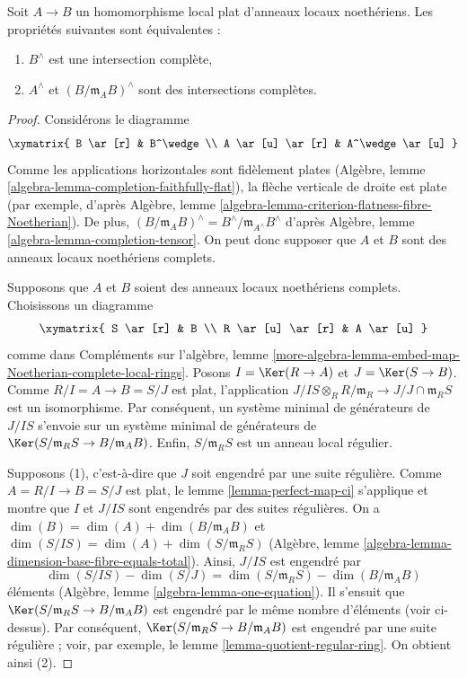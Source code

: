 \begin{proposition}
\label{proposition-avramov}
Soit $A \to B$ un homomorphisme local plat d'anneaux locaux noethériens. Les
propriétés suivantes sont équivalentes :
\begin{enumerate}
\item $B^\wedge$ est une intersection complète,
\item $A^\wedge$ et $(B/\mathfrak m_A B)^\wedge$ sont des intersections complètes.
\end{enumerate}
\end{proposition}

\begin{proof}
Considérons le diagramme
$$
\xymatrix{
B \ar[r] & B^\wedge\\
A \ar[u] \ar[r] & A^\wedge\ar[u]
}
$$
Comme les applications horizontales sont fidèlement
plates (Algèbre, lemme \ref{algebra-lemma-completion-faithfully-flat}),
la flèche verticale de droite est plate (par
exemple, d'après Algèbre, lemme
\ref{algebra-lemma-criterion-flatness-fibre-Noetherian}).
De plus,
$(B/\mathfrak m_A B)^\wedge = B^\wedge/\mathfrak m_{A^\wedge} B^\wedge$
d'après Algèbre, lemme \ref{algebra-lemma-completion-tensor}. On
peut donc supposer que $A$ et $B$ sont des anneaux locaux noethériens complets.

\medskip\noindent
Supposons que $A$ et $B$ soient des anneaux locaux noethériens complets.
Choisissons un diagramme
$$
\xymatrix{
S \ar[r] & B \\
R \ar[u] \ar[r] & A \ar[u]
}
$$
comme dans Compléments sur l'algèbre, lemme
\ref{more-algebra-lemma-embed-map-Noetherian-complete-local-rings}.
Posons $I = \Ker(R \to A)$ et $J = \Ker(S \to B)$.
Comme $R/I = A \to B = S/J$ est plat, l'application
$J/IS \otimes_R R/\mathfrak m_R \to J/J \cap\mathfrak m_R S$
est un isomorphisme. Par conséquent, un système minimal de générateurs de $J/IS$
s'envoie sur un système minimal de générateurs de
$\Ker(S/\mathfrak m_R S \to B/\mathfrak m_A B)$.
Enfin, $S/\mathfrak m_R S$ est un anneau local régulier.

\medskip\noindent
Supposons (1), c'est-à-dire que $J$ soit engendré par une suite régulière.
Comme $A = R/I \to B = S/J$ est plat, le
lemme \ref{lemma-perfect-map-ci} s'applique et montre
que $I$ et $J/IS$ sont engendrés par des suites
régulières. On a $\dim(B) = \dim(A) + \dim(B/\mathfrak m_A B)$ et
$\dim(S/IS) = \dim(A) + \dim(S/\mathfrak m_R S)$
(Algèbre, lemme \ref{algebra-lemma-dimension-base-fibre-equals-total}).
Ainsi, $J/IS$ est engendré par
$$
\dim(S/IS) - \dim(S/J) = \dim(S/\mathfrak m_R S) - \dim(B/\mathfrak m_A B)
$$
éléments (Algèbre, lemme \ref{algebra-lemma-one-equation}).
Il s'ensuit que $\Ker(S/\mathfrak m_R S \to B/\mathfrak m_A B)$
est engendré par le même nombre d'éléments (voir ci-dessus). Par
conséquent, $\Ker(S/\mathfrak m_R S \to B/\mathfrak m_A B)$
est engendré par une suite régulière ; voir, par exemple, le
lemme \ref{lemma-quotient-regular-ring}.
On obtient ainsi (2).


\end{proof}
